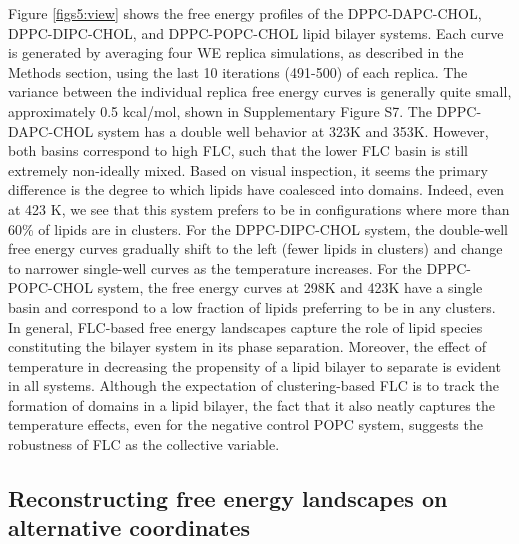 \documentclass{biophys-new}
\begin{document}
Figure \ref{figs5:view} shows the free energy profiles of the DPPC-DAPC-CHOL, DPPC-DIPC-CHOL, and DPPC-POPC-CHOL lipid bilayer systems.
Each curve is generated by averaging four WE replica simulations, as described in the Methods section, using the last 10 iterations (491-500) of each replica.
The variance between the individual replica free energy curves is generally quite small, approximately 0.5 kcal/mol, shown in Supplementary Figure S7.
The DPPC-DAPC-CHOL system has a double well behavior at 323K and 353K.
However, both basins correspond to high FLC, such that the lower FLC basin is still extremely non-ideally mixed. Based on visual inspection, it seems the primary difference is the degree to which lipids have coalesced into domains.
Indeed, even at 423 K, we see that this system prefers to be in configurations where more than 60\% of lipids are in clusters.
For the DPPC-DIPC-CHOL system, the double-well free energy curves gradually shift to the left (fewer lipids in clusters) and change to narrower single-well curves as the temperature increases.
For the DPPC-POPC-CHOL system, the free energy curves at 298K and 423K have a single basin and correspond to a low fraction of lipids preferring to be in any clusters.
In general, FLC-based free energy landscapes capture the role of lipid species constituting the bilayer system in its phase separation.
Moreover, the effect of temperature in decreasing the propensity of a lipid bilayer to separate is evident in all systems.
Although the expectation of clustering-based FLC is to track the formation of domains in a lipid bilayer, the fact that it also neatly captures the temperature effects, even for the negative control POPC system, suggests the robustness of FLC as the collective variable.

\subsection*{Reconstructing free energy landscapes on alternative coordinates}
\end{document}
